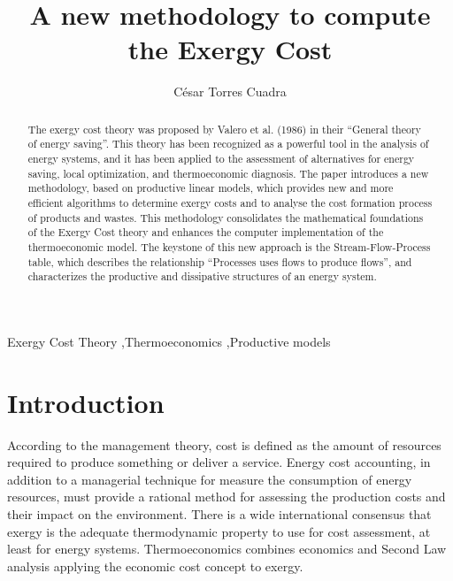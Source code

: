 \documentclass[preprint,12pt,times]{elsarticle}
\begin{document}
\begin{frontmatter}


\title{A new methodology to compute the Exergy Cost}

\author{C\'esar Torres Cuadra}

\address{University of Zaragoza, Spain}

\begin{abstract}
The exergy cost theory was proposed by Valero et al. (1986) in their “General theory of energy saving”. This theory has been recognized as a powerful tool in the analysis of energy systems, and it has been applied to the assessment of alternatives for energy saving, local optimization, and thermoeconomic diagnosis.
The paper introduces a new methodology, based on productive linear models, which provides new and more efficient algorithms to determine exergy costs and to analyse the cost formation process of products and wastes. This methodology consolidates the mathematical foundations of the Exergy Cost theory and enhances the computer implementation of the thermoeconomic model.
The keystone of this new approach is the Stream-Flow-Process table, which describes the relationship “Processes uses flows to produce flows”, and characterizes the productive and dissipative structures of an energy system. 
\end{abstract}

\begin{keyword}
Exergy Cost Theory \sep Thermoeconomics \sep Productive models
\end{keyword}

\end{frontmatter}

\section{Introduction}
\label{S:1}
According to the management theory, cost is defined as the amount of resources required to produce something or deliver a service. Energy cost accounting, in addition to a managerial technique for measure the consumption of energy resources, must provide a rational method for assessing the production costs and their impact on the environment.
There is a wide international consensus that exergy is the adequate thermodynamic property to use for cost assessment, at least for energy systems. Thermoeconomics combines economics and Second Law analysis applying the economic cost concept to exergy.
\end{document}
